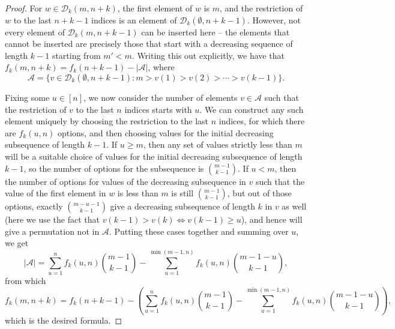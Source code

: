 \documentclass{amsart}
\theoremstyle{definition}
\begin{document}
\begin{proof}
For $w\in \mathcal{D}_k(m,n+k)$, the first element of $w$ is $m$, and the restriction of $w$ to the last $n+k-1$ indices is an element of $\mathcal{D}_k\left(\emptyset, n+k-1\right)$. However, not every element of $\mathcal{D}_k(m,n+k-1)$ can be inserted here -- the elements that cannot be inserted are precisely those that start with a decreasing sequence of length $k-1$ starting from $m'<m$. Writing this out explicitly, we have that $f_k(m,n+k)=f_k(n+k-1)-|\mathcal{A}|$, where
\[\mathcal{A}=\{v\in \mathcal{D}_k\left(\emptyset, n+k-1\right)\colon m>v(1)>v(2)>\cdots >v(k-1)\}.\]

Fixing some $u\in [n]$, we now consider the number of elements $v\in \mathcal{A}$ such that the restriction of $v$ to the last $n$ indices starts with $u$. We can construct any such element uniquely by choosing the restriction to the last $n$ indices, for which there are $f_k(u,n)$ options, and then choosing values for the initial decreasing subsequence of length $k-1$. If $u\geq m$, then any set of values strictly less than $m$ will be a suitable choice of values for the initial decreasing subsequence of length $k-1$, so the number of options for the subsequence is $\binom{m-1}{k-1}$. If $u<m$, then the number of options for values of the decreasing subsequence in $v$ such that the value of the first element in $w$ is less than $m$ is still $\binom{m-1}{k-1}$, but out of those options, exactly $\binom{m-u-1}{k-1}$ give a decreasing subsequence of length $k$ in $v$ as well (here we use the fact that $v(k-1)>v(k)\iff v(k-1)\geq u$), and hence will give a permutation not in $\mathcal{A}$. Putting these cases together and summing over $u$, we get
\[|\mathcal{A}|=\sum_{u=1}^{n}f_k(u,n)\binom{m-1}{k-1}-\sum_{u=1}^{\min(m-1,n)}f_k(u,n)\binom{m-1-u}{k-1},\]
from which
\[f_k(m,n+k)=f_k(n+k-1)-\left(\sum_{u=1}^{n}f_k(u,n)\binom{m-1}{k-1}-\sum_{u=1}^{\min(m-1,n)}f_k(u,n)\binom{m-1-u}{k-1}\right),\]
which is the desired formula.
\end{proof}

\end{document}
